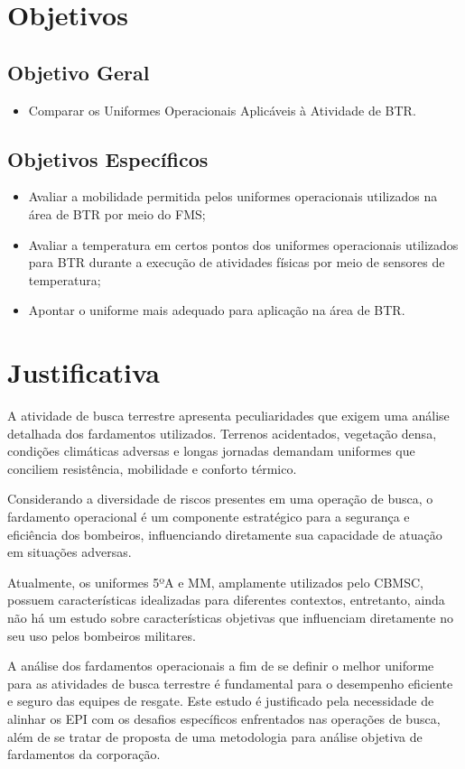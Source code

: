 \section{Objetivos}

\subsection{Objetivo Geral}
\begin{itemize}
	\item Comparar os Uniformes Operacionais Aplicáveis à Atividade de \acrlong{BTR}.
\end{itemize}
\subsection{Objetivos Específicos}
\begin{itemize}
	\item Avaliar a mobilidade permitida pelos uniformes operacionais utilizados na área de \acrlong{BTR} por meio do \acrfull{FMS};
	\item Avaliar a temperatura em certos pontos dos uniformes operacionais utilizados para \acrlong{BTR} durante a execução de atividades físicas por meio de sensores de temperatura;
	\item Apontar o uniforme mais adequado para aplicação na área de \acrlong{BTR}.
\end{itemize}
\section{Justificativa}
	
	A atividade de busca terrestre apresenta peculiaridades que exigem uma análise detalhada dos fardamentos utilizados. 
	Terrenos acidentados, vegetação densa, condições climáticas adversas e longas jornadas demandam uniformes que conciliem resistência, mobilidade e conforto térmico.
	
	\tab Considerando a diversidade de riscos presentes em uma operação de busca, o fardamento operacional é um componente estratégico para
	 a segurança e eficiência dos bombeiros, influenciando diretamente sua capacidade de atuação em situações adversas.
	
	 \tab Atualmente, os uniformes 5ºA e \acrlong{MM}, amplamente utilizados pelo \acrshort{CBMSC}, possuem características idealizadas para diferentes contextos,
	  entretanto, ainda não há um estudo sobre características objetivas que influenciam diretamente no seu uso pelos bombeiros militares.
	
	  \tab A análise dos fardamentos operacionais a fim de se definir o melhor uniforme para as atividades de busca terrestre é fundamental 
	  para o desempenho eficiente e seguro das equipes de resgate. Este estudo é justificado pela necessidade de alinhar os 
	  \acrfull{EPI} com os desafios específicos enfrentados nas operações de busca, além de se tratar de proposta de uma metodologia
	   para análise objetiva de fardamentos da corporação.

\newpage